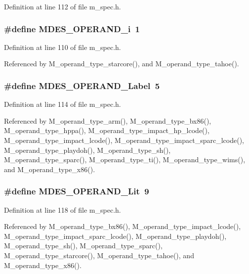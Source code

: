 Definition at line 112 of file m\_\-spec.h.
\subsubsection{\setlength{\rightskip}{0pt plus 5cm}\#define MDES\_\-OPERAND\_\-i~1}\label{m__spec_8h_37d2c920556ee813481994fe8722fe07}




Definition at line 110 of file m\_\-spec.h.

Referenced by M\_\-operand\_\-type\_\-starcore(), and M\_\-operand\_\-type\_\-tahoe().
\subsubsection{\setlength{\rightskip}{0pt plus 5cm}\#define MDES\_\-OPERAND\_\-Label~5}\label{m__spec_8h_b25b806804abf31ece3ec26184b56150}




Definition at line 114 of file m\_\-spec.h.

Referenced by M\_\-operand\_\-type\_\-arm(), M\_\-operand\_\-type\_\-bx86(), M\_\-operand\_\-type\_\-hppa(), M\_\-operand\_\-type\_\-impact\_\-hp\_\-lcode(), M\_\-operand\_\-type\_\-impact\_\-lcode(), M\_\-operand\_\-type\_\-impact\_\-sparc\_\-lcode(), M\_\-operand\_\-type\_\-playdoh(), M\_\-operand\_\-type\_\-sh(), M\_\-operand\_\-type\_\-sparc(), M\_\-operand\_\-type\_\-ti(), M\_\-operand\_\-type\_\-wims(), and M\_\-operand\_\-type\_\-x86().
\subsubsection{\setlength{\rightskip}{0pt plus 5cm}\#define MDES\_\-OPERAND\_\-Lit~9}\label{m__spec_8h_efc67dc0ffc7f3ad77efd43c7d0f85b5}




Definition at line 118 of file m\_\-spec.h.

Referenced by M\_\-operand\_\-type\_\-bx86(), M\_\-operand\_\-type\_\-impact\_\-lcode(), M\_\-operand\_\-type\_\-impact\_\-sparc\_\-lcode(), M\_\-operand\_\-type\_\-playdoh(), M\_\-operand\_\-type\_\-sh(), M\_\-operand\_\-type\_\-sparc(), M\_\-operand\_\-type\_\-starcore(), M\_\-operand\_\-type\_\-tahoe(), and M\_\-operand\_\-type\_\-x86().
